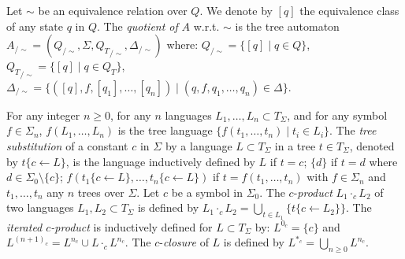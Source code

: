 \documentclass{llncs}
\begin{document}
 Let $\sim$ be an equivalence relation over $Q$. We denote by $[q]$ the equivalence class of any state $q$ in $Q$. The \emph{quotient of} $A$ w.r.t. $\sim$ is the tree automaton $A_{/\sim}=( Q_{/\sim}, \Sigma, {Q_{T}}_{/\sim},\Delta_{/\sim} )$ where: $Q_{/\sim}=\{[q]\mid q\in Q\}$, ${Q_{T}}_{/\sim}=\{[q]\mid q\in Q_T\}$, $\Delta_{/\sim}=\{([q],f,[q_1],\ldots,[q_n]) \mid (q,f,q_1,\ldots,q_n)\in \Delta\}$.
 
  For any integer $n\geq 0$, for any $n$ languages $L_1, \dots, L_n\subset T_{\Sigma}$, and for any symbol  $f\in \Sigma_n$, $f(L_1, \dots, L_n)$ is the tree language $\lbrace f(t_1, \dots, t_n)\mid t_i\in L_i\rbrace$. The \emph{tree substitution} of a constant $c$ in $\Sigma$ by a language $L\subset T_{\Sigma}$ in a tree $t\in T_{\Sigma}$, denoted by $t\lbrace c \leftarrow L\rbrace$, is the language inductively defined by $L$ if $t=c$; $\lbrace d\rbrace$ if $t=d$ where $d\in \Sigma_0\setminus\{c\}$; $f(t_1\lbrace c \leftarrow L\rbrace, \dots, t_n\lbrace c \leftarrow L\rbrace)$ if $t=f(t_1, \dots, t_n)$ with $f\in\Sigma_n$ and $t_1, \dots, t_n$ any $n$ trees over $\Sigma$.
Let $c$ be a symbol in $\Sigma_0$. The $c$-\emph{product} $L_1\cdot_{c} L_2$ of two languages $L_1, L_2\subset T_{\Sigma}$ is  defined by $L_1\cdot_{c} L_2=\bigcup_{t\in L_1}\lbrace t\lbrace c \leftarrow L_2\rbrace \rbrace$. The \emph{iterated $c$-product} is  inductively  defined for $L\subset T_{\Sigma}$ by:  $L^{0_c}=\lbrace c \rbrace$ and $L^{{(n+1)}_c}=L^{n_c}\cup L\cdot_{c} L^{n_c}$. The $c$-\emph{closure} of $L$ is defined by  $L^{*_c}=\bigcup_{n\geq 0} L^{n_c}$.
    
\end{document}
